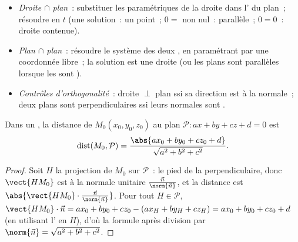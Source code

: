 \begin{method}\label{met:g12:space:intersections}
\begin{itemize}
  \item \emph{Droite $\cap$ plan}~: substituer les  paramétriques
        de la droite dans l' du plan~; résoudre en $t$ (une
        solution~: un point~; $0 = $ non nul~: parallèle~; $0 = 0$~: droite
        contenue).
  \item \emph{Plan $\cap$ plan}~: résoudre le système des deux ,
        en paramétrant par une coordonnée libre~; la solution est une droite
        (ou les plans sont parallèles lorsque les  sont
        ).
  \item \emph{Contrôles d'orthogonalité}~: droite $\perp$ plan ssi sa
        direction est  à la normale~; deux plans sont
        perpendiculaires ssi leurs normales sont .
\end{itemize}
\end{method}

\begin{proposition}\label{prop:g12:space:distance}
Dans un , la distance de $M_0(x_0, y_0, z_0)$ au plan
$\mathcal P : ax + by + cz + d = 0$ est
\[
\operatorname{dist}(M_0, \mathcal P)
= \frac{\abs{ax_0 + by_0 + cz_0 + d}}{\sqrt{a^2 + b^2 + c^2}}.
\]
\end{proposition}

\begin{proof}
Soit $H$ la projection  de $M_0$ sur $\mathcal P$~: le pied de
la perpendiculaire, donc $\vect{HM_0}$ est  à la normale unitaire
$\frac{\vec n}{\norm{\vec n}}$, et la distance est
$\abs{\vect{HM_0}\cdot \frac{\vec n}{\norm{\vec n}}}$. Pour tout
$H \in \mathcal P$,
$\vect{HM_0}\cdot\vec n = ax_0 + by_0 + cz_0 - (ax_H + by_H + cz_H)
= ax_0 + by_0 + cz_0 + d$ (en utilisant l' en $H$), d'où la formule
après division par $\norm{\vec n} = \sqrt{a^2+b^2+c^2}$.
\end{proof}

